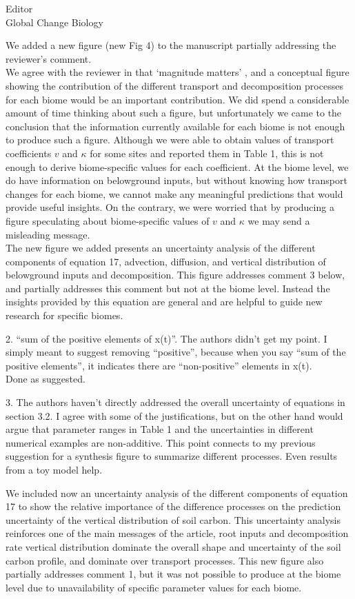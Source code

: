 \documentclass[11pt]{bgcletter}
\newcommand{\answer}[1] {
{\color{cyan} #1}
}
\begin{document}
\begin{letter}{Editor\\
   Global Change Biology
}
\answer{We added a new figure (new Fig 4) to the manuscript partially addressing the reviewer's comment.  \\We agree with the reviewer in that `magnitude matters' , and a conceptual figure showing the contribution of the different transport and decomposition processes for each biome would be an important contribution. We did spend a considerable amount of time thinking about such a figure, but unfortunately we came to the conclusion that the information currently available for each biome is not enough to produce such a figure. Although we were able to obtain values of transport coefficients $v$ and $\kappa$ for some sites and reported them in Table 1, this is not enough to derive biome-specific values for each coefficient. At the biome level, we do have information on belowground inputs, but without knowing how transport changes for each biome, we cannot make any meaningful predictions that would provide useful insights. On the contrary, we were worried that by producing a figure speculating about biome-specific values of $v$ and $\kappa$ we may send a misleading message. \\ The new figure we added presents an uncertainty analysis of the different components of equation 17, advection, diffusion, and vertical distribution of belowground inputs and decomposition. This figure addresses comment 3 below, and partially addresses this comment but not at the biome level. Instead the insights provided by this equation are general and are helpful to guide new research for specific biomes.  }

2. ``sum of the positive elements of x(t)''. The authors didn't get my point. I simply meant to suggest removing ``positive'', because when you say ``sum of the positive elements'', it indicates there are ``non-positive'' elements in x(t). \\
\answer{Done as suggested.}

3. The authors haven't directly addressed the overall uncertainty of equations in section 3.2. I agree with some of the justifications, but on the other hand would argue that parameter ranges in Table 1 and the uncertainties in different numerical examples are non-additive. This point connects to my previous suggestion for a synthesis figure to summarize different processes. Even results from a toy model help.

\answer{We included now an uncertainty analysis of the different components of equation 17 to show the relative importance of the difference processes on the prediction uncertainty of the vertical distribution of soil carbon. This uncertainty analysis reinforces one of the main messages of the article, root inputs and decomposition rate vertical distribution dominate the overall shape and uncertainty of the soil carbon profile, and dominate over transport processes. This new figure also partially addresses comment 1, but it was not possible to produce at the biome level due to unavailability of specific parameter values for each biome. }


\end{letter}
\end{document}
